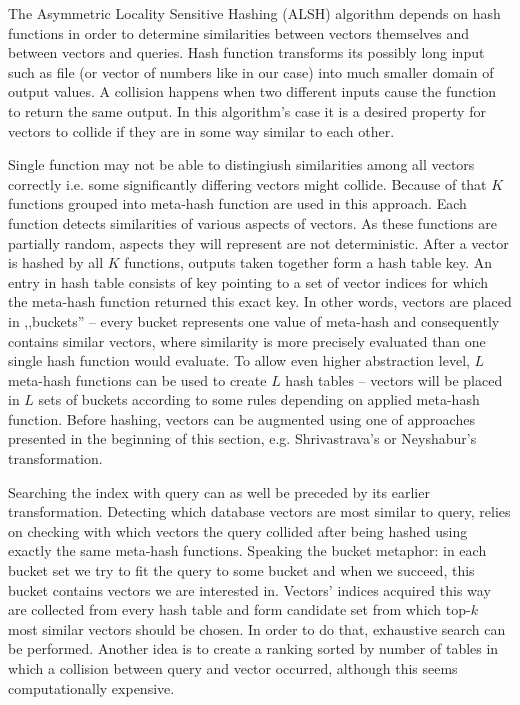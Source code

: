 The Asymmetric Locality Sensitive Hashing (ALSH) \cite{alsh} algorithm depends on hash functions
in order to determine similarities between vectors themselves and between vectors and queries.
Hash function transforms its possibly long input such as file (or vector of numbers like in our case)
into much smaller domain of output values.
A collision happens when two different inputs cause the function to return the same output.
In this algorithm's case it is a desired property for vectors to collide if they are in some way similar to each other.
\par
Single function may not be able to distingiush similarities among all vectors correctly i.e. some
significantly differing vectors might collide. Because of that $K$ functions grouped into
meta-hash function are used in this approach. Each function detects similarities of various aspects of vectors.
As these functions are partially random, aspects they will represent are not deterministic.
After a vector is hashed by all $K$ functions, outputs taken together form a hash table key.
An entry in hash table consists of key pointing to a set of vector indices for which the meta-hash function
returned this exact key. In other words, vectors are placed in ,,buckets'' --
every bucket represents one value of meta-hash and consequently contains similar vectors, where
similarity is more precisely evaluated than one single hash function would evaluate.
To allow even higher abstraction level, $L$ meta-hash functions can be used to create $L$ hash tables --
vectors will be placed in $L$ sets of buckets according to some rules depending on applied meta-hash function.
Before hashing, vectors can be augmented using one of approaches presented in the beginning
of this section, e.g. Shrivastrava's or Neyshabur's transformation.
\par
Searching the index with query can as well be preceded by its earlier transformation.
Detecting which database vectors are most similar to query, relies on checking with which
vectors the query collided after being hashed using exactly the same meta-hash functions.
Speaking the bucket metaphor: in each bucket set we try to fit the query to some bucket and when
we succeed, this bucket contains vectors we are interested in.
Vectors' indices acquired this way are collected from every hash table and form candidate set from which top-$k$
most similar vectors should be chosen. In order to do that, exhaustive search can be performed.
Another idea is to create a ranking sorted by number of tables in which a collision
between query and vector occurred, although this seems computationally expensive.
